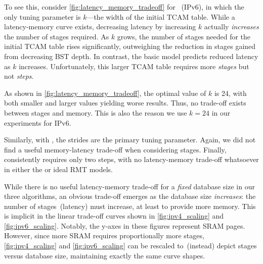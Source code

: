 To see this, consider \cref{fig:latency_memory_tradeoff} for \bsic~(IPv6), in which the only tuning parameter is $k$---the width of the initial TCAM table. While a latency-memory curve exists, decreasing latency by increasing $k$ actually {\em increases} the number of stages required. As $k$ grows, the number of stages needed for the initial TCAM table rises significantly, outweighing the reduction in stages gained from decreasing BST depth. In contrast, the basic \cram model predicts reduced latency as $k$ increases. Unfortunately, this larger TCAM table requires more {\em stages} but not {\em steps}.

As shown in \cref{fig:latency_memory_tradeoff}, the optimal value of $k$ is 24, with both smaller and larger values yielding worse results. Thus, no trade-off exists between stages and memory. This is also the reason we use $k=24$ in our experiments for IPv6.

Similarly, with \mashup, the strides are the primary tuning parameter. Again, we did not find a useful memory-latency trade-off when considering stages. Finally, \resail consistently requires only two steps, with no latency-memory trade-off whatsoever in either the \cram or ideal RMT models.

While there is no useful latency-memory trade-off for a {\em fixed} database size in our three algorithms, an obvious trade-off emerges as the database size {\em increases}: the number of stages~(latency) must increase, at least to provide more memory. This is implicit in the linear trade-off curves shown in \cref{fig:ipv4_scaling} and \cref{fig:ipv6_scaling}. Notably, the y-axes in these figures represent SRAM pages. However, since more SRAM requires proportionally more stages, \cref{fig:ipv4_scaling} and \cref{fig:ipv6_scaling} can be rescaled to~(instead) depict stages versus database size, maintaining exactly the same curve shapes.

